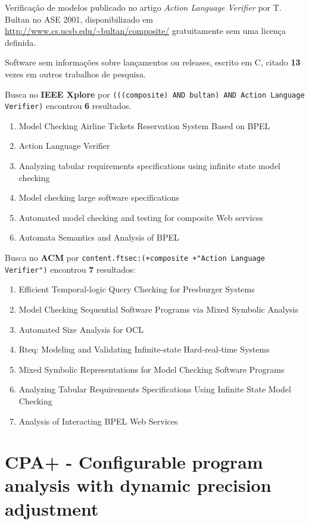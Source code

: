 Verificação de modelos
publicado no artigo {\it Action Language Verifier}
por T. Bultan
no ASE 2001,
disponibilizado em \url{http://www.cs.ucsb.edu/~bultan/composite/}
gratuitamente
sem uma licença definida.

Software sem informações sobre lançamentos ou releases,
escrito em C,
citado {\bf 13} vezes em outros trabalhos de pesquisa.

Busca no {\bf IEEE Xplore} por
\texttt{(((composite) AND bultan) AND Action Language Verifier)}
encontrou {\bf 6}
resultados.

\begin{enumerate}
\item Model Checking Airline Tickets Reservation System Based on BPEL
\item Action Language Verifier
\item Analyzing tabular requirements specifications using infinite state model checking
\item Model checking large software specifications
\item Automated model checking and testing for composite Web services
\item Automata Semantics and Analysis of BPEL
\end{enumerate}

Busca no {\bf ACM} por
\texttt{content.ftsec:(+composite +"Action Language Verifier")}
encontrou {\bf 7}
resultados:

\begin{enumerate}
\item Efficient Temporal-logic Query Checking for Presburger Systems
\item Model Checking Sequential Software Programs via Mixed Symbolic Analysis
\item Automated Size Analysis for OCL
\item Rteq: Modeling and Validating Infinite-state Hard-real-time Systems
\item Mixed Symbolic Representations for Model Checking Software Programs
\item Analyzing Tabular Requirements Specifications Using Infinite State Model Checking
\item Analysis of Interacting BPEL Web Services
\end{enumerate}

\section{CPA+ - Configurable program analysis with dynamic precision adjustment}

